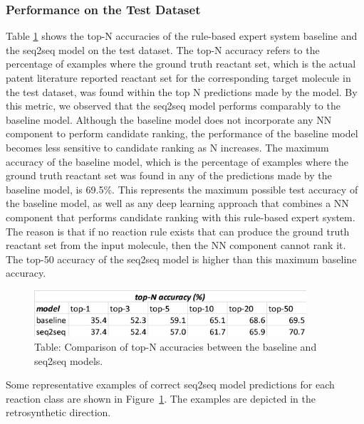 \subsubsection{Performance on the Test Dataset}

Table \ref{fig:ret_table2} shows the top-N accuracies of the rule-based expert system baseline and the seq2seq model on the test dataset. The top-N accuracy refers to the percentage of examples where the ground truth reactant set, which is the actual patent literature reported reactant set for the corresponding target molecule in the test dataset, was found within the top N predictions made by the model. By this metric, we observed that the seq2seq model performs comparably to the baseline model. Although the baseline model does not incorporate any NN component to perform candidate ranking, the performance of the baseline model becomes less sensitive to candidate ranking as N increases. The maximum accuracy of the baseline model, which is the percentage of examples where the ground truth reactant set was found in any of the predictions made by the baseline model, is 69.5\%. This represents the maximum possible test accuracy of the baseline model, as well as any deep learning approach that combines a NN component that performs candidate ranking with this rule-based expert system. The reason is that if no reaction rule exists that can produce the ground truth reactant set from the input molecule, then the NN component cannot rank it. The top-50 accuracy of the seq2seq model is higher than this maximum baseline accuracy. 


\begin{figure}
  \centering
  \includegraphics[width=0.9\textwidth]{Images/ret_table_2.png}
  \caption{Table: Comparison of top-N accuracies between the baseline and seq2seq models.}
  \label{fig:ret_table2}
\end{figure}

Some representative examples of correct seq2seq model predictions for each reaction class are shown in Figure~\ref{fig:ret_table2}. The examples are depicted in the retrosynthetic direction.

